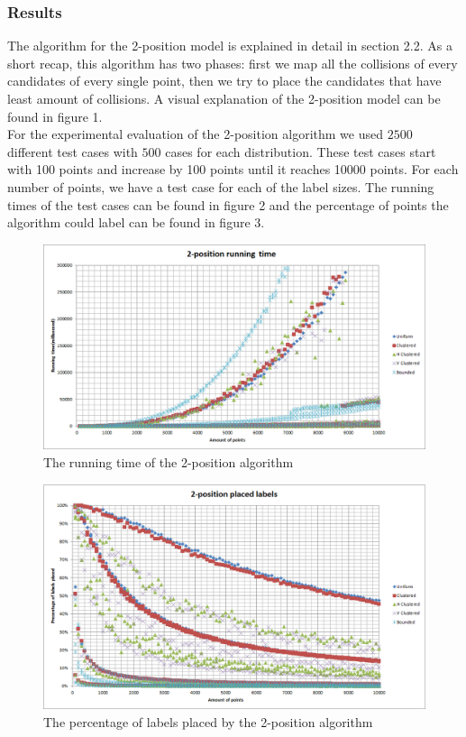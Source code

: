 \documentclass[crop=false,a4paper,oneside,11pt]{standalone}
\begin{document}
\subsubsection{Results}
The algorithm for the 2-position model is explained in detail in section 2.2. As a short recap, this algorithm has two phases: first we map all the collisions of every candidates of every single point, then we try to place the candidates that have least amount of collisions. A visual explanation of the 2-position model can be found in figure 1.\\
For the experimental evaluation of the 2-position algorithm we used $2500$ different test cases with $500$ cases for each distribution. These test cases start with 100 points and increase by 100 points until it reaches 10000 points. For each number of points, we have a test case for each of the label sizes. The running times of the test cases can be found in figure 2 and the percentage of points the algorithm could label can be found in figure 3.\\

\begin{figure}[H]
 \centering
  \centerline{\includegraphics[scale = 0.5]{2PosRunningTime.png}}
  \caption{The running time of the 2-position algorithm}
 \end{figure}

\begin{figure}[H]
 \centering
  \centerline{\includegraphics[scale = 0.5]{2PosLabelsPlaced.png}}
  \caption{The percentage of labels placed by the 2-position algorithm}
 \end{figure}
\end{document}
